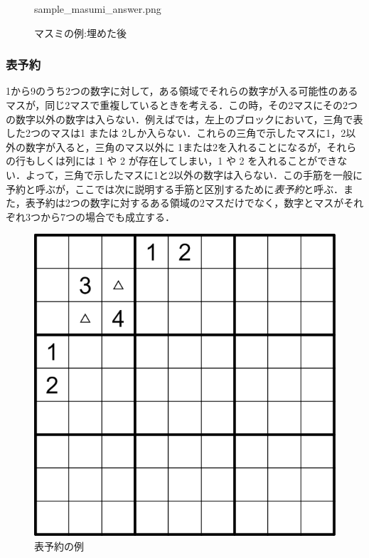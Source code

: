 \documentclass[submit,techrep,noauthor]{ipsj}
\begin{document}
\begin{figure}[tb]
\begin{minipage}[t]{0.5\columnwidth}
      		{sample_masumi_answer.png}
 	\caption{マスミの例:埋めた後}
 	\label{sample_masumi_answer}
	\end{minipage}
  	\end{figure}

\subsubsection{表予約}
1から9のうち2つの数字に対して，ある領域でそれらの数字が入る可能性のあるマスが，同じ2マスで重複しているときを考える．この時，その2マスにその2つの数字以外の数字は入らない．例えばでは，左上のブロックにおいて，三角で表した2つのマスは1 または 2しか入らない．これらの三角で示したマスに1，2以外の数字が入ると，三角のマス以外に 1または2を入れることになるが，それらの行もしくは列には 1 や 2 が存在してしまい，1 や 2 を入れることができない．よって，三角で示したマスに1と2以外の数字は入らない．この手筋を一般に予約と呼ぶが，ここでは次に説明する手筋と区別するために\emph{表予約}と呼ぶ\cite{数独通信43}．また，表予約は2つの数字に対するある領域の2マスだけでなく，数字とマスがそれぞれ3つから7つの場合でも成立する．

	\begin{figure}[tb]
	 \centering
 	\includegraphics[keepaspectratio, scale=0.2]
      		{sample_yoyaku_blo2.png}
 	\caption{表予約の例}
 	\label{yoyaku_sample}
	\end{figure}
\end{document}
